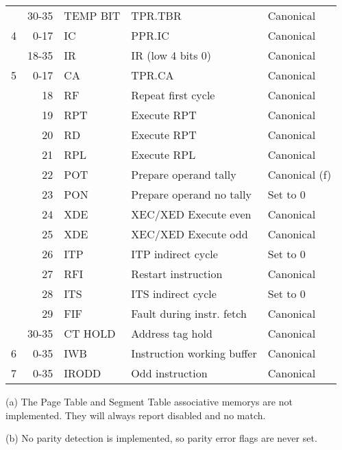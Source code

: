 \documentclass[notitlepage]{report}
\begin{document}
\begin{tabular}{lrlll}
     & 30-35 & TEMP BIT  & TPR.TBR                             & Canonical \\
4    & 0-17  & IC        & PPR.IC                              & Canonical \\
     & 18-35 & IR        & IR (low 4 bits 0)                   & Canonical \\
5    & 0-17  & CA        & TPR.CA                              & Canonical \\
     & 18    & RF        & Repeat first cycle                  & Canonical \\
     & 19    & RPT       & Execute RPT                         & Canonical \\
     & 20    & RD        & Execute RPT                         & Canonical \\
     & 21    & RPL       & Execute RPL                         & Canonical \\
     & 22    & POT       & Prepare operand tally               & Canonical (f) \\
     & 23    & PON       & Prepare operand no tally            & Set to 0 \\
     & 24    & XDE       & XEC/XED Execute even                & Canonical \\
     & 25    & XDE       & XEC/XED Execute odd                 & Canonical \\
     & 26    & ITP       & ITP indirect cycle                  & Set to 0 \\
     & 27    & RFI       & Restart instruction                 & Canonical \\
     & 28    & ITS       & ITS indirect cycle                  & Set to 0 \\
     & 29    & FIF       & Fault during instr. fetch           & Canonical \\
     & 30-35 & CT HOLD   & Address tag hold                    & Canonical \\
6    & 0-35  & IWB       & Instruction working buffer          & Canonical \\
7    & 0-35  & IRODD     & Odd instruction                     & Canonical \\
\end{tabular}

(a) The Page Table and Segment Table associative memorys are not
implemented. They will always report disabled and no match.

(b) No parity detection is implemented, so parity error flags are never set.
\end{document}
